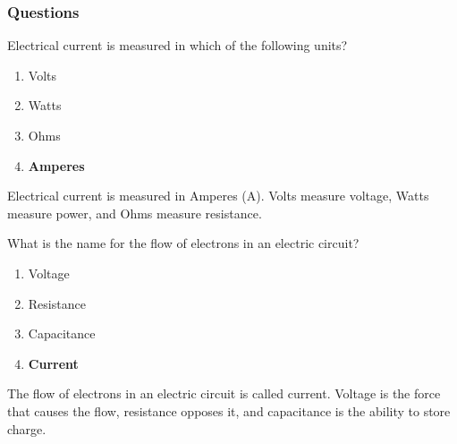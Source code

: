 

\subsubsection*{Questions}

\begin{tcolorbox}[colback=gray!10!white,colframe=black!75!black,title={T5A01}]
    Electrical current is measured in which of the following units?
    \begin{enumerate}[label=\Alph*),noitemsep]
        \item Volts
        \item Watts
        \item Ohms
        \item \textbf{Amperes}
    \end{enumerate}
\end{tcolorbox}
Electrical current is measured in Amperes (A). Volts measure voltage, Watts measure power, and Ohms measure resistance.

\begin{tcolorbox}[colback=gray!10!white,colframe=black!75!black,title={T5A03}]
    What is the name for the flow of electrons in an electric circuit?
    \begin{enumerate}[label=\Alph*),noitemsep]
        \item Voltage
        \item Resistance
        \item Capacitance
        \item \textbf{Current}
    \end{enumerate}
\end{tcolorbox}
The flow of electrons in an electric circuit is called current. Voltage is the force that causes the flow, resistance opposes it, and capacitance is the ability to store charge.

